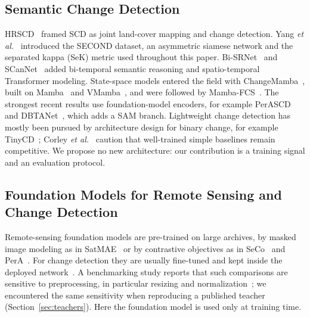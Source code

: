 \documentclass[journal]{IEEEtran}
\begin{document}
\subsection{Semantic Change Detection}
HRSCD~\cite{daudt2019multitask} framed SCD as joint land-cover mapping and change detection.
Yang \emph{et al.}~\cite{yang2022asymmetric} introduced the SECOND dataset, an asymmetric
siamese network and the separated kappa (SeK) metric used throughout this paper. Bi-SRNet~\cite{ding2022bi} and SCanNet~\cite{ding2024joint} added bi-temporal semantic reasoning and spatio-temporal Transformer modeling. State-space models entered the field with ChangeMamba~\cite{chen2024changemamba}, built on Mamba~\cite{gu2023mamba} and VMamba~\cite{liu2024vmamba}, and were followed by Mamba-FCS~\cite{wijenayake2026mamba}. The strongest recent results use foundation-model encoders, for example PerASCD~\cite{shen2026foundation} and DBTANet~\cite{li2026dual}, which adds a SAM branch. Lightweight change detection has mostly been pursued by architecture design for binary change, for example TinyCD~\cite{codegoni2023tinycd}; Corley \emph{et al.}~\cite{corley2024change} caution that well-trained simple baselines remain competitive. We propose no new architecture: our contribution is a training signal and an
evaluation protocol.

\subsection{Foundation Models for Remote Sensing and Change Detection}
Remote-sensing foundation models are pre-trained on large archives, by masked image modeling as in SatMAE~\cite{cong2022satmae} or by contrastive objectives as in SeCo~\cite{manas2021seasonal} and PerA~\cite{shen2026contrastive}. For change detection they are usually fine-tuned and kept inside the deployed network~\cite{shen2026foundation,ding2024adapting,li2026dual}. A benchmarking study reports that such comparisons are sensitive to preprocessing, in particular resizing and normalization~\cite{corley2024revisiting}; we encountered the same sensitivity when reproducing a published teacher (Section~\ref{sec:teachers}). Here the foundation model is used only at training
time.
\end{document}
